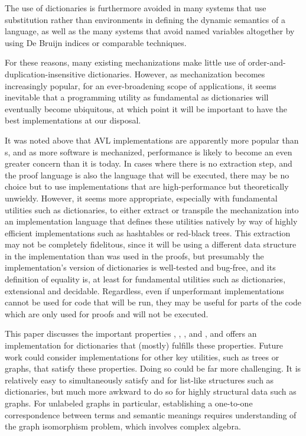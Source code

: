 The use of dictionaries is furthermore avoided in many systems that use substitution rather than environments
%
in defining the dynamic semantics of a language, as well as the many systems that avoid named variables altogether by using De Bruijn indices \cite{XXX,XXX,XXX} or comparable techniques.

For these reasons, many existing mechanizations make little use of order-and-duplication-insensitive dictionaries. 
%
However, as mechanization becomes increasingly popular, for an ever-broadening scope of applications,
%
it seems inevitable that a programming utility as fundamental as dictionaries will eventually become ubiquitous, at which point it will be important to have the
%
best implementations at our disposal.

%
It was noted above that AVL implementations are apparently more popular than {\cal}s, and as more software is mechanized, performance is likely to become an
%
even greater concern than it is today. In cases where there is no extraction step, and the proof language is also the language that will be executed,
%
there may be no choice but to use implementations that are high-performance but theoretically unwieldy. However, it seems more appropriate, especially with
%
fundamental utilities such as dictionaries, to either extract or transpile the mechanization into an implementation language that defines these utilities natively
%
by way of highly efficient implementations such as hashtables or red-black trees. This extraction may not be completely fidelitous, since it will be using a
%
different data structure in the implementation than was used in the proofs, but presumably the implementation's version of dictionaries is well-tested and bug-free,
%
and its definition of equality is, at least for fundamental utilities such as dictionaries, extensional and decidable. Regardless, even if unperformant implementations
%
cannot be used for code that will be run, they may be useful for parts of the code which are only used for proofs and will not be executed.

%
This paper discusses the important properties \SemTot, \SemInj, \EqDec, and \EzDstr, and offers an implementation for dictionaries that (mostly) fulfills these properties.
%
Future work could consider implementations for other key utilities, such as trees or graphs, that satisfy these properties.
%
Doing so could be far more challenging.
%
It is relatively easy to simultaneously satisfy \SemTot{} and \SemInj{} for list-like structures such as dictionaries,
%
but much more awkward to do so for highly structural data such as graphs. For unlabeled graphs in particular, establishing a one-to-one correspondence between terms and
%
semantic meanings requires understanding of the graph isomorphism problem, which involves complex algebra.

